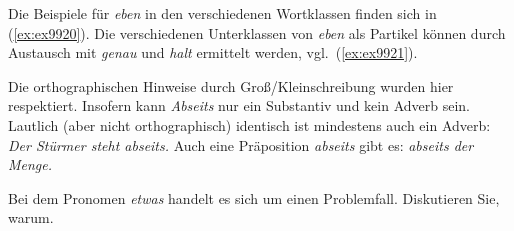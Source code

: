 
Die Beispiele für \textit{eben} in den verschiedenen Wortklassen finden sich in (\ref{ex:ex9920}).
Die verschiedenen Unterklassen von \textit{eben} als Partikel können durch Austausch mit \textit{genau} und \textit{halt} ermittelt werden, vgl.\ (\ref{ex:ex9921}).

\begin{exe}
  \ex \label{ex:ex9920}
  \begin{xlist}
  \end{xlist}
  \ex \label{ex:ex9921}
  \begin{xlist}
  \end{xlist}
\end{exe}


Die orthographischen Hinweise durch Groß/Kleinschreibung wurden hier respektiert.
Insofern kann \textit{Abseits} nur ein Substantiv und \zB kein Adverb sein.
Lautlich (aber nicht orthographisch) identisch ist mindestens auch ein Adverb: \textit{Der Stürmer steht abseits.}
Auch eine Präposition \textit{abseits} gibt es: \textit{abseits der Menge.}

Bei dem Pronomen \textit{etwas} handelt es sich um einen Problemfall.
Diskutieren Sie, warum.

